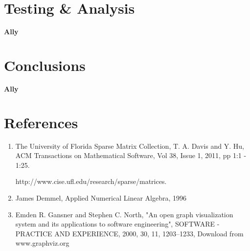 \documentclass[11pt, oneside]{article}   	%
\begin{document}
\section{Testing \& Analysis}

\textbf{Ally}

\section{Conclusions}

\textbf{Ally}

\section{References}

\begin{enumerate}

\item The University of Florida Sparse Matrix Collection, T. A. Davis and Y. Hu, ACM Transactions on Mathematical Software, Vol 38, Issue 1, 2011, pp 1:1 - 1:25.

http://www.cise.ufl.edu/research/sparse/matrices.

\item James Demmel, Applied Numerical Linear Algebra, 1996

\item Emden R. Gansner and Stephen C. North, "An open graph visualization system and its applications to software engineering", SOFTWARE - PRACTICE AND EXPERIENCE, 2000, 30, 11, 1203--1233, Download from www.graphviz.org

\end{enumerate}
\end{document}
